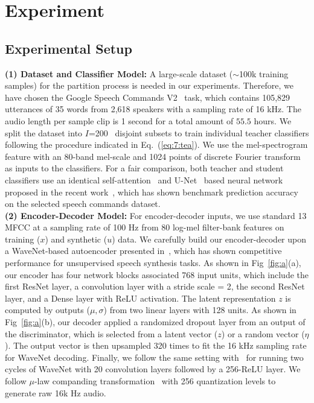 \documentclass[a4paper]{article}
\begin{document}
\section{Experiment}
\subsection{Experimental Setup}
\textbf{(1) Dataset and Classifier Model:} A large-scale dataset ($\sim$100k training samples)  for the partition process is needed in our experiments. Therefore, we have chosen the Google Speech Commands V2~\cite{warden2018speech} task, which contains 105,829 utterances of 35 words from 2,618 speakers with a sampling rate of 16 kHz. The audio length per sample clip is 1 second for a total amount of $55.5$ hours. We split the dataset into $I$=200~\cite{jordon2019pate} disjoint subsets to train individual teacher classifiers following the procedure indicated in Eq.~(\ref{eq:7:tea}). We use the mel-spectrogram feature with an 80-band mel-scale and 1024 points of discrete Fourier transform as inputs to the classifiers. For a fair comparison, both teacher and student classifiers use an identical self-attention~\cite{vaswani2017attention} and U-Net~\cite{ronneberger2015u} based neural network proposed in the recent work~\cite{yang2020decentralizing}, which has shown benchmark prediction accuracy on the selected speech commands dataset.
\\
\textbf{(2) Encoder-Decoder Model:}
For encoder-decoder inputs, we use standard 13 MFCC at a sampling rate of 100 Hz from 80 log-mel filter-bank features on training ($x$) and synthetic ($u$) data. We carefully build our encoder-decoder upon a WaveNet-based autoencoder presented in~\cite{chorowski2019unsupervised}, which has shown competitive performance for unsupervised speech synthesis tasks. As shown in Fig~\ref{fig:a}(a), our encoder has four network blocks associated 768 input units, which include the first ResNet layer, a convolution layer with a stride scale = 2, the second ResNet layer, and a Dense layer with ReLU activation. The latent representation $z$ is computed by outputs ($\mu, \sigma$) from two linear layers with 128 units. As shown in Fig~\ref{fig:a}(b), our decoder applied a randomized dropout layer from an output of the discriminator, which is selected from a latent vector ($z$) or a random vector ($\eta$). The output vector is then upsampled 320 times to fit the 16 kHz sampling rate for WaveNet decoding. Finally, we follow the same setting with~\cite{chorowski2019unsupervised} for running two cycles of WaveNet with 20 convolution layers followed by a 256-ReLU layer. We follow $\mu$-law companding transformation~\cite{recommendation1988pulse, oord2016wavenet} with 256 quantization levels to generate raw 16k Hz audio.
\end{document}
